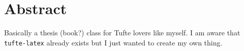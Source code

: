 \chapter{Abstract}
Basically a thesis (book?) class for Tufte lovers like myself. I am aware that \texttt{tufte-latex} already exists but I just wanted to create my own thing.

